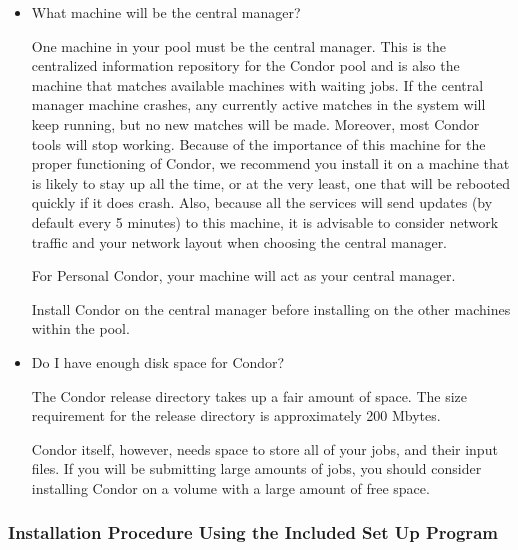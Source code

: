 \begin{itemize} 

\item{What machine will be the central manager?}

One machine in your pool must be the central manager.
This is the
centralized information repository for the Condor pool and is also the
machine that matches available machines with waiting
jobs.  If the central manager machine crashes, any currently active
matches in the system will keep running, but no new matches will be
made.  Moreover, most Condor tools will stop working.  Because of the
importance of this machine for the proper functioning of Condor, we
recommend you install it on a machine that is likely to stay up all the
time, or at the very least, one that will be rebooted quickly if it
does crash.  Also, because all the services will send updates (by
default every 5 minutes) to this machine, it is advisable to consider
network traffic and your network layout when choosing the central
manager.

For Personal Condor, your machine will act as your central manager.

Install Condor on the central manager before installing
on the other machines within the pool.

\item{Do I have enough disk space for Condor?}

The Condor release directory takes up a fair amount of space.
The size requirement for the release
directory is approximately 200 Mbytes.

Condor itself, however, needs space to store all of your jobs, and their
input files.  If you will be submitting large amounts of jobs,
you should consider installing Condor on a volume with a large amount
of free space.

\end{itemize}


\subsubsection{\label{sec:nt-install-procedure}
Installation Procedure Using the Included Set Up Program}

